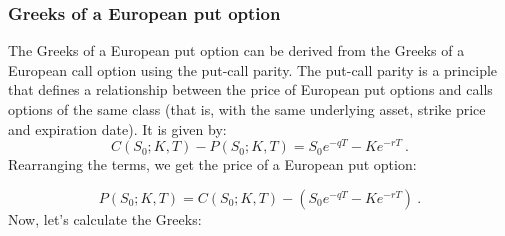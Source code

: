 

\subsubsection{Greeks of a European put option}

The Greeks of a European put option can be derived from the Greeks of a European call option using the put-call parity. The put-call parity is a principle that defines a relationship between the price of European put options and calls options of the same class (that is, with the same underlying asset, strike price and expiration date). It is given by:
$$
C(S_0; K, T) - P(S_0; K, T)  = S_0 e^{-q T} - K e^{-r T} \ .
$$
Rearranging the terms, we get the price of a European put option:

$$
P(S_0; K, T) = C(S_0; K, T) - \left(S_0 e^{-q T} - K e^{-r T}\right) \ .
$$
Now, let's calculate the Greeks:

